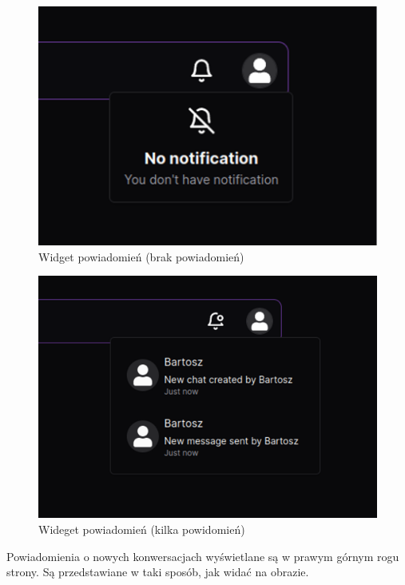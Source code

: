 \documentclass[12pt]{article}
\begin{document}
\newpage
\begin{figure}[h!]
	\centering
	\includegraphics[width=17.5cm]{figures/Obraz20.png}
	\caption{Widget powiadomień (brak powiadomień)}
\end{figure}


\newpage
\begin{figure}[h!]
	\centering
	\includegraphics[width=17.5cm]{figures/Obraz21.png}
	\caption{Wideget powiadomień (kilka powidomień)}
\end{figure}
Powiadomienia o nowych konwersacjach wyświetlane 
są w prawym górnym rogu strony. 
Są przedstawiane w taki sposób, jak widać na obrazie.
\end{document}
